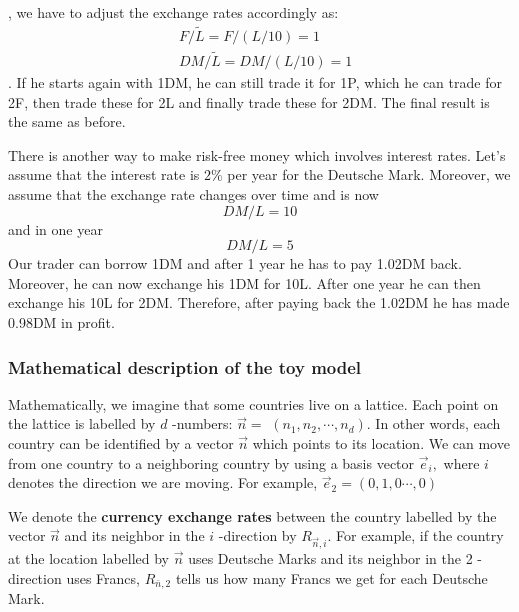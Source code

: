 , we have to adjust the exchange rates accordingly as:
$$
\begin{aligned}
&F / \tilde{L}=F /(L / 10)=1\\
&D M / \tilde{L}=D M /(L / 10)=1
\end{aligned}
$$
. If he starts again with 1DM, he can still trade it for 1P, which he can trade for 2F, then trade these for 2L and finally trade these for 2DM. The final result is the same as before.


There is another way to make risk-free money which involves interest rates. Let's assume that the interest rate is $2 \%$ per year for the Deutsche Mark. Moreover, we assume that the exchange rate changes over time and is now
$$
D M / L=10
$$
and in one year
$$
D M / L=5
$$
Our trader can borrow 1DM and after 1 year he has to pay 1.02DM back. Moreover, he can now exchange his 1DM for 10L. After one year he can then exchange his 10L for 2DM. Therefore, after paying back the 1.02DM he has made 0.98DM in profit.


\subsubsection{Mathematical description of the toy model}
Mathematically, we imagine that some countries live on a lattice. Each point on the lattice is labelled by $d$ -numbers: $\vec{n}=$ $\left(n_{1}, n_{2}, \cdots, n_{d}\right) .$ In other words, each country can be identified by a vector $\vec{n}$ which points to its location. We can move from one country to a neighboring country by using a basis vector $\vec{e}_{i},$ where $i$ denotes the direction we are moving. For example, $\vec{e}_{2}=(0,1,0 \cdots, 0)$

We denote the \textbf{currency exchange rates} between the country labelled by the vector $\vec{n}$ and its neighbor in the $i$ -direction by $R_{\vec{n}, i}$. For example, if the country at the location labelled by $\vec{n}$ uses Deutsche Marks and its neighbor in the 2 -direction uses Francs, $R_{\bar{n}, 2}$ tells us how many Francs we get for each Deutsche Mark. 

